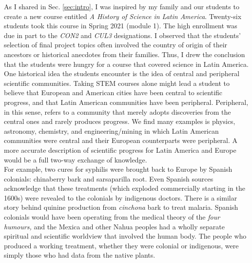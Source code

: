 \documentclass[../../../main.tex]{subfiles}
\begin{document}
As I shared in Sec. \ref{sec:intro}, I was inspired by my family and our students to create a new course entitled \textit{A History of Science in Latin America}.  Twenty-six students took this course in Spring 2021 (module 1).  The high enrollment was due in part to the \textit{CON2} and \textit{CUL3} designations.  I observed that the students' selection of final project topics often involved the country of origin of their ancestors or historical anecdotes from their families.  Thus, I drew the conclusion that the students were hungry for a course that covered science in Latin America.
\\
\vspace{0.15cm}
One historical idea the students encounter is the idea of central and peripheral scientific communities. Taking STEM courses alone might lead a student to believe that European and American cities have been central to scientific progress, and that Latin American communities have been peripheral. Peripheral, in this sense, refers to a community that merely adopts discoveries from the central ones and rarely produces progress. We find many examples is physics, astronomy, chemistry, and engineering/mining in which Latin American communities were central and their European counterparts were peripheral. A more accurate description of scientific progress for Latin America and Europe would be a full two-way exchange of knowledge.
\\
\vspace{0.15cm}
For example, two cures for syphilis were brought back to Europe by Spanish colonials: chinaberry bark and sarsaparilla root.  Even Spanish sources acknowledge that these treatments (which exploded commercially starting in the 1600s) were revealed to the colonials by indigenous doctors.  There is a similar story behind quinine production from \textit{cinchona} bark to treat malaria.  Spanish colonials would have been operating from the medical theory of the \textit{four humours,} and the Mexica and other Nahua peoples had a wholly separate spiritual and scientific worldview that involved the human body.  The people who produced a working treatment, whether they were colonial or indigenous, were simply those who had data from the native plants.
\\
\vspace{0.15cm}
\end{document}
